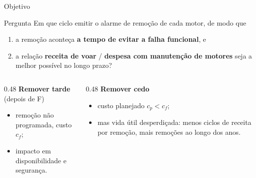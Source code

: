 \documentclass[aspectratio=169,10pt]{beamer}
\begin{document}
\begin{frame}{Objetivo}
  \begin{block}{Pergunta}
    Em que ciclo emitir o alarme de remoção de cada motor, de modo que
    \begin{enumerate}
      \item a remoção aconteça \textbf{a tempo de evitar a falha funcional}, e
      \item a relação \textbf{receita de voar} / \textbf{despesa com manutenção de motores} seja a melhor possível no longo prazo?
    \end{enumerate}
  \end{block}
  \medskip
  \begin{columns}[T]
    \begin{column}{0.48\textwidth}
      \textbf{Remover tarde} (depois de F)
      \begin{itemize}
        \item remoção não programada, custo $c_f$;
        \item impacto em disponibilidade e segurança.
      \end{itemize}
    \end{column}
    \begin{column}{0.48\textwidth}
      \textbf{Remover cedo}
      \begin{itemize}
        \item custo planejado $c_p < c_f$;
        \item mas vida útil desperdiçada: menos ciclos de receita por remoção, mais remoções ao longo dos anos.
      \end{itemize}
    \end{column}
  \end{columns}
\end{frame}
\end{document}
